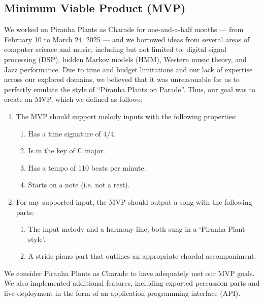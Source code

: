 \subsection{Minimum Viable Product (MVP)}

We worked on Piranha Plants as Charade for one-and-a-half months --- from February 10 to March 24, 2025 --- and we borrowed ideas from several areas of computer science and music, including but not limited to: digital signal processing (DSP), hidden Markov models (HMM), Western music theory, and Jazz performance. Due to time and budget limitations and our lack of expertise across our explored domains, we believed that it was unreasonable for us to perfectly emulate the style of ``Piranha Plants on Parade''. Thus, our goal was to create an MVP, which we defined as follows:
\begin{enumerate}
    \item The MVP should support melody inputs with the following properties:
    \begin{enumerate}
        \item Has a time signature of 4/4.
        \item Is in the key of C major.
        \item Has a tempo of 110 beats per minute.
        \item Starts on a note (i.e. not a rest).
    \end{enumerate}
    \item For any supported input, the MVP should output a song with the following parts:
    \begin{enumerate}
        \item The input melody and a harmony line, both sung in a `Piranha Plant style'.
        \item A stride piano part that outlines an appropriate chordal accompaniment.
    \end{enumerate}
\end{enumerate}
We consider Piranha Plants as Charade to have adequately met our MVP goals. We also implemented additional features, including exported percussion parts and live deployment in the form of an application programming interface (API).
